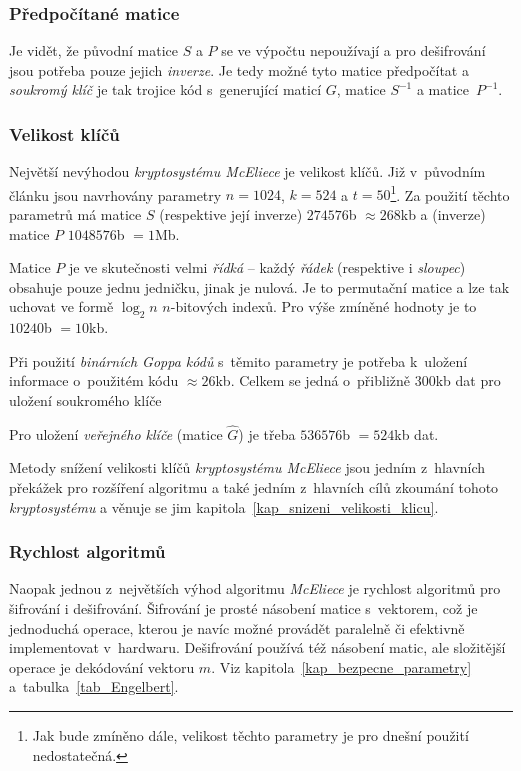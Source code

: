 \documentclass[thesis=M,czech,hidelinks]{FITthesis}[2012/06/26]
\newcommand{\0}{{\textcolor[gray]{0.80}{0}}}
\begin{document}
\subsubsection{Předpočítané matice}
Je vidět, že původní matice $S$ a $P$ se ve výpočtu nepoužívají a pro
dešifrování jsou potřeba pouze jejich \emph{inverze}. Je tedy možné tyto matice
předpočítat a \emph{soukromý klíč} je tak trojice kód s~generující maticí $G$,
matice $S^{-1}$ a matice~$P^{-1}$.

\subsubsection{Velikost klíčů}\label{kap_velikost_klicu}
Největší nevýhodou \emph{kryptosystému McEliece} je velikost klíčů. Již
v~původním článku jsou navrhovány parametry $n=1024$, $k=524$ a $t=50$\footnote{
    Jak bude zmíněno dále, velikost těchto parametry je pro dnešní použití
    nedostatečná.
}. Za použití těchto parametrů má matice $S$ (respektive její inverze)
$274576$\;b $\approx 268$\;kb a (inverze) matice $P$ $1048576$\;b $= 1$\;Mb.

Matice $P$ je ve skutečnosti velmi \emph{řídká} -- každý \emph{řádek}
(respektive i \emph{sloupec}) obsahuje pouze jednu jedničku, jinak je nulová. Je
to permutační matice a lze tak uchovat ve formě $\log_2 n$ $n$-bitových indexů.
Pro výše zmíněné hodnoty je to $10240$\;b $=10$\;kb.

Při použití \emph{binárních Goppa kódů} s~těmito parametry je potřeba k~uložení
informace o~použitém kódu $\approx 26$\;kb. Celkem se jedná o~přibližně
$300$\;kb dat pro uložení soukromého klíče

Pro uložení \emph{veřejného klíče} (matice $\hat{G}$) je třeba $536576$\;b
$=524$\;kb dat.

Metody snížení velikosti klíčů \emph{kryptosystému McEliece} jsou jedním
z~hlavních překážek pro rozšíření algoritmu a také jedním z~hlavních cílů
zkoumání tohoto \emph{kryptosystému} a věnuje se jim
kapitola~\ref{kap_snizeni_velikosti_klicu}.

\subsubsection{Rychlost algoritmů}
Naopak jednou z~největších výhod algoritmu \emph{McEliece} je rychlost algoritmů
pro šifrování i dešifrování. Šifrování je prosté násobení matice s~vektorem, což
je jednoduchá operace, kterou je navíc možné provádět paralelně či efektivně
implementovat v~hardwaru. Dešifrování používá též násobení matic, ale složitější
operace je dekódování vektoru $\hat{m}$. Viz kapitola~\ref{kap_bezpecne_parametry}
a~tabulka~\ref{tab_Engelbert}.
\end{document}
